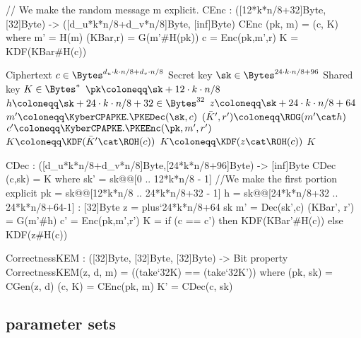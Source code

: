 \begin{code}
  // We make the random message m explicit.
  CEnc : ([12*k*n/8+32]Byte, [32]Byte) -> ([d_u*k*n/8+d_v*n/8]Byte, [inf]Byte)
  CEnc (pk, m) = (c, K) where
    m' = H(m)
    (KBar,r) = G(m'#H(pk))
    c = Enc(pk,m',r)
    K = KDF(KBar#H(c))
\end{code}

\begin{algorithm}
  \caption{$\KyberCCAKEM.\KEMDec(c,\sk)$\label{alg:ccadec}}
  \begin{algorithmic}[1]
    \Require Ciphertext $c \in \Bytes^{d_u\cdot k\cdot n/8 + d_v\cdot n/8}$
    \Require Secret key $\sk \in \Bytes^{24\cdot k\cdot n/8 + 96}$
    \Ensure Shared key $K \in \Bytes^*$
    \State $\pk \coloneqq \sk+12\cdot k\cdot n/8$
    \State $h \coloneqq \sk+24\cdot k\cdot n/8 + 32 \in \Bytes^{32}$
    \State $z \coloneqq \sk+24\cdot k\cdot n/8 + 64$
    \State $m'\coloneqq \KyberCPAPKE.\PKEDec(\sk,c)$
    \State $(\bar{K}',r') \coloneqq \ROG(m'\cat h)$
    \State $c' \coloneqq \KyberCPAPKE.\PKEEnc(\pk, m', r')$
      \State \Return $K \coloneqq \KDF(\bar{K}'\cat \ROH(c))$
    \Else
      \State \Return $K \coloneqq \KDF(z\cat \ROH(c))$
    \EndIf 
    \State \Return $K$
  \end{algorithmic}
\end{algorithm}

\begin{code}
  CDec : ([d_u*k*n/8+d_v*n/8]Byte,[24*k*n/8+96]Byte) -> [inf]Byte
  CDec (c,sk) = K
    where
      sk' = sk@@[0 .. 12*k*n/8 - 1] //We make the first portion explicit
      pk = sk@@[12*k*n/8 .. 24*k*n/8+32 - 1]
      h = sk@@[24*k*n/8+32 .. 24*k*n/8+64-1] : [32]Byte
      z = plus`{24*k*n/8+64} sk
      m' = Dec(sk',c)
      (KBar', r') = G(m'#h)
      c' = Enc(pk,m',r')
      K = if (c == c') then KDF(KBar'#H(c))
                       else KDF(z#H(c))


  CorrectnessKEM : ([32]Byte, [32]Byte, [32]Byte) -> Bit
  property CorrectnessKEM(z, d, m) = ((take`{32}K) == (take`{32}K')) where
    (pk, sk) = CGen(z, d)
    (c, K) = CEnc(pk, m)
    K' = CDec(c, sk)
\end{code}

\subsection{\Kyber parameter sets}
\label{subsec:specification:params}

